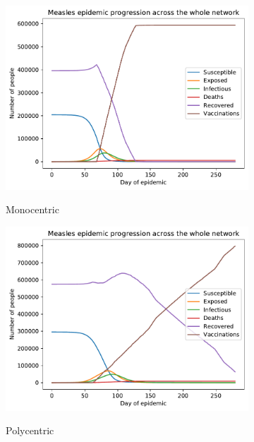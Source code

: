 \documentclass[10pt,letterpaper]{article}
\begin{document}
\begin{figure}[ht!]
  \begin{subfigure}[b]{0.5\textwidth}
    \includegraphics[width=\textwidth]{figures/base_vaccs/monocentric_40km_vaccs.pdf}
    \label{si:vaccs_mono}
    \caption{Monocentric}
  \end{subfigure}
  \begin{subfigure}[b]{0.5\textwidth}
    \includegraphics[width=\textwidth]{figures/base_vaccs/polycentric_100km_vaccs.pdf}
    \label{si:vaccs_poly}
    \caption{Polycentric}
  \end{subfigure}
  \hspace{1cm}
  \begin{subfigure}[b]{0.5\textwidth}

\end{subfigure}
\end{figure}
\end{document}
